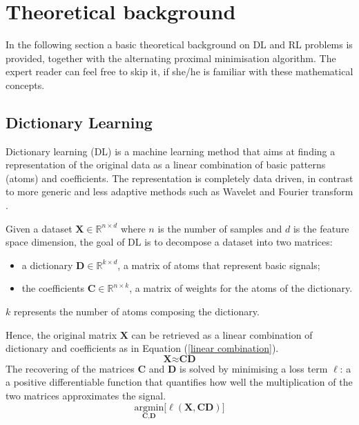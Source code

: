 \documentclass[a4paper,UKenglish]{oasics-v2016}
\begin{document}
\section{Theoretical background} \label{background}

In the following section a basic theoretical background on DL and RL problems is provided, together with the alternating proximal minimisation algorithm. The expert reader can feel free to skip it, if she/he is familiar with these mathematical concepts.


\subsection{Dictionary Learning}
Dictionary learning (DL) is a machine learning method that aims at finding a representation of the original data as a linear combination of basic patterns (atoms) and coefficients. The representation is completely data driven, in contrast to more generic and less adaptive methods such as Wavelet and Fourier transform \cite{mallat2008wavelet, vetterli2013fourier}.

Given a dataset $\textbf{X} \in \mathbb{R}^{n\times d}$ where $n$ is the number of samples and $d$ is the feature space dimension, the goal of DL is to decompose a dataset into two matrices:
\begin{itemize}
\item a dictionary $\textbf{D} \in \mathbb{R}^{k\times d}$, a matrix of atoms that represent basic signals;
\item the coefficients $\textbf{C} \in \mathbb{R}^{n\times k}$, a matrix of weights for the atoms of the dictionary.
\end{itemize}
$k$ represents the number of atoms composing the dictionary.%

Hence, the original matrix $\textbf{X}$ can be retrieved as a linear combination of dictionary and coefficients as in Equation (\ref{linear combination}).
\begin{equation}\label{linear combination}
\textbf{X} \approx \textbf{C}\textbf{D}
\end{equation}
The recovering of the matrices $\textbf{C}$ and $\textbf{D}$ is solved by minimising a loss term $\ell$: a a positive differentiable function that quantifies how well the multiplication of the two matrices approximates the signal.
\begin{equation}\label{loss function}
\underset{\textbf{C}, \textbf{D}}{\text{argmin}}\bigg[\ell(\textbf{X}, \textbf{C} \textbf{D}) \bigg]
\end{equation}
\end{document}
